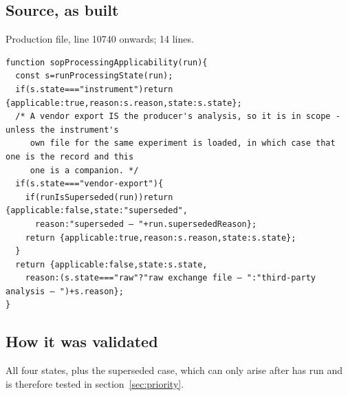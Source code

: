 \subsection*{Source, as built}
Production file, line 10740 onwards; 14 lines.
\begin{lstlisting}[style=js]
function sopProcessingApplicability(run){
  const s=runProcessingState(run);
  if(s.state==="instrument")return {applicable:true,reason:s.reason,state:s.state};
  /* A vendor export IS the producer's analysis, so it is in scope - unless the instrument's
     own file for the same experiment is loaded, in which case that one is the record and this
     one is a companion. */
  if(s.state==="vendor-export"){
    if(runIsSuperseded(run))return {applicable:false,state:"superseded",
      reason:"superseded — "+run.supersededReason};
    return {applicable:true,reason:s.reason,state:s.state};
  }
  return {applicable:false,state:s.state,
    reason:(s.state==="raw"?"raw exchange file — ":"third-party analysis — ")+s.reason};
}
\end{lstlisting}

\subsection*{How it was validated}
All four states, plus the superseded case, which can only arise after
 has run and is therefore tested in section~\ref{sec:priority}.
